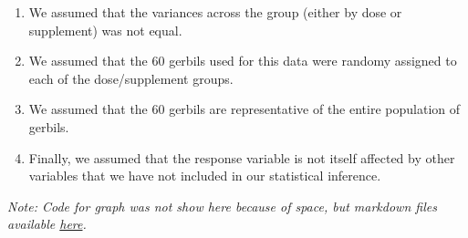 \documentclass[]{article}
\begin{document}
\begin{enumerate}
\def\labelenumi{\arabic{enumi}.}
\itemsep1pt\parskip0pt
\item
  We assumed that the variances across the group (either by dose or
  supplement) was not equal.
\item
  We assumed that the 60 gerbils used for this data were randomy
  assigned to each of the dose/supplement groups.
\item
  We assumed that the 60 gerbils are representative of the entire
  population of gerbils.
\item
  Finally, we assumed that the response variable is not itself affected
  by other variables that we have not included in our statistical
  inference.
\end{enumerate}

\emph{Note: Code for graph was not show here because of space, but
markdown files available
\href{https://github.com/anandi42/Stat_Inf/blob/master/CourseProj_part2.Rmd}{here}.}
\end{document}
